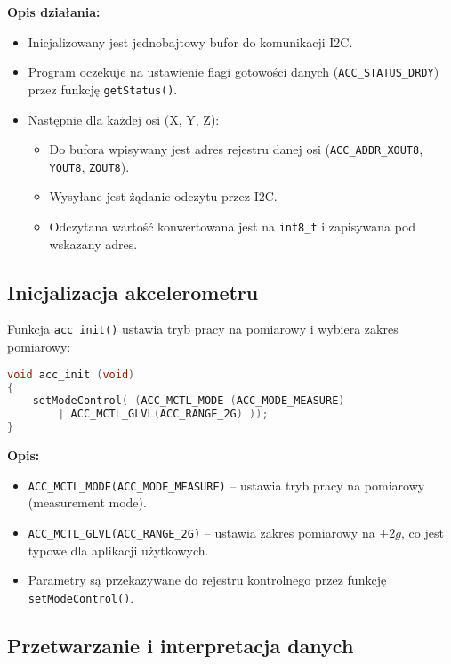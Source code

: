 \documentclass[a4paper,12pt]{report}
\begin{document}
\textbf{Opis działania:}
\begin{itemize}
    \item Inicjalizowany jest jednobajtowy bufor do komunikacji I2C.
    \item Program oczekuje na ustawienie flagi gotowości danych (\texttt{ACC\_STATUS\_DRDY}) przez funkcję \texttt{getStatus()}.
    \item Następnie dla każdej osi (X, Y, Z):
    \begin{itemize}
        \item Do bufora wpisywany jest adres rejestru danej osi (\texttt{ACC\_ADDR\_XOUT8}, \texttt{YOUT8}, \texttt{ZOUT8}).
        \item Wysyłane jest żądanie odczytu przez I2C.
        \item Odczytana wartość konwertowana jest na \texttt{int8\_t} i zapisywana pod wskazany adres.
    \end{itemize}
\end{itemize}

\subsection*{Inicjalizacja akcelerometru}

Funkcja \texttt{acc\_init()} ustawia tryb pracy na pomiarowy i wybiera zakres pomiarowy:

\begin{lstlisting}[language=C]
void acc_init (void)
{
    setModeControl( (ACC_MCTL_MODE (ACC_MODE_MEASURE)
        | ACC_MCTL_GLVL(ACC_RANGE_2G) ));
}
\end{lstlisting}

\textbf{Opis:}
\begin{itemize}
    \item \texttt{ACC\_MCTL\_MODE(ACC\_MODE\_MEASURE)} – ustawia tryb pracy na pomiarowy (measurement mode).
    \item \texttt{ACC\_MCTL\_GLVL(ACC\_RANGE\_2G)} – ustawia zakres pomiarowy na \(\pm2g\), co jest typowe dla aplikacji użytkowych.
    \item Parametry są przekazywane do rejestru kontrolnego przez funkcję \texttt{setModeControl()}.
\end{itemize}

\subsection*{Przetwarzanie i interpretacja danych}
\end{document}
